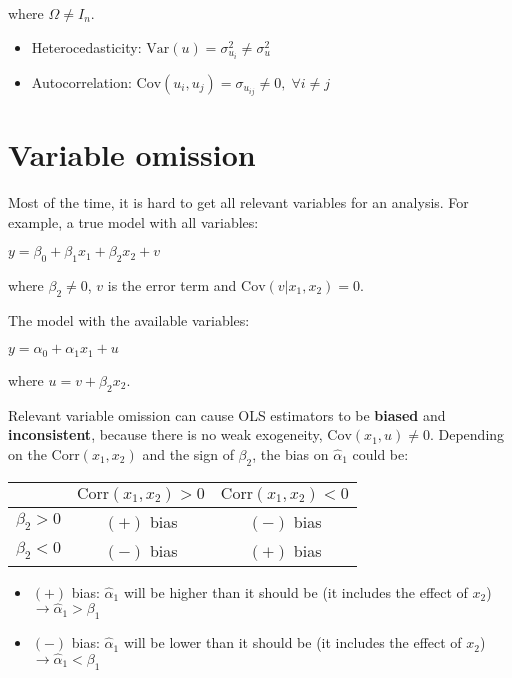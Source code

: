 \documentclass[10pt, a4paper, landscape]{article}
\newcommand{\Var}{\mathrm{Var}}
\newcommand{\Cov}{\mathrm{Cov}}
\newcommand{\Corr}{\mathrm{Corr}}
\begin{document}
\begin{multicols}{3}
		\quad where $\Omega \neq I_{n}$.
		
		\begin{itemize}[leftmargin=*]
			\item Heterocedasticity: $\Var(u) = \sigma^{2}_{u_i} \neq \sigma^{2}_{u}$
			\item Autocorrelation: $\Cov(u_{i}, u_{j}) = \sigma_{u_{ij}} \neq 0, \; \forall i \neq j$
		\end{itemize}
		
		\section*{Variable omission}
		
		Most of the time, it is hard to get all relevant variables for an analysis. For example, a true model with all variables:
		
		\begin{center}
			$y = \beta_{0} + \beta_{1} x_{1} + \beta_{2} x_{2} + v$
		\end{center}
		
		\quad where $\beta_{2} \neq 0$, $v$ is the error term and $\Cov(v|x_{1},x_{2}) = 0$.
		
		The model with the available variables:
		
		\begin{center}
			$y = \alpha_{0} + \alpha_{1} x_{1} + u$
		\end{center}
		
		\quad where $u = v + \beta_{2} x_{2}$.
		
		Relevant variable omission can cause OLS estimators to be \textbf{biased} and \textbf{inconsistent}, because there is no weak exogeneity, $\Cov(x_{1}, u) \neq 0$. Depending on the $\Corr(x_{1}, x_{2})$ and the sign of $\beta_{2}$, the bias on $\hat{\alpha}_{1}$ could be:
		
		\begin{center}
			\begin{tabular}{ c | c c }
				                & $\Corr(x_{1}, x_{2}) > 0$ & $\Corr(x_{1}, x_{2}) < 0$ \\ \hline
				$\beta_{2} > 0$ & $(+)$ bias                & $(-)$ bias                \\
				$\beta_{2} < 0$ & $(-)$ bias                & $(+)$ bias
			\end{tabular}
		\end{center}
		
		\begin{itemize}[leftmargin=*]
			\item $(+)$ bias: $\hat{\alpha}_{1}$ will be higher than it should be (it includes the effect of $x_{2}$) $\rightarrow \hat{\alpha}_{1} > \beta_{1}$
			\item $(-)$ bias: $\hat{\alpha}_{1}$ will be lower than it should be (it includes the effect of $x_{2}$) $\rightarrow \hat{\alpha}_{1} < \beta_{1}$
		\end{itemize}
		

\end{multicols}
\end{document}

